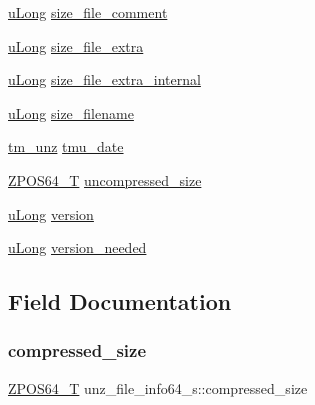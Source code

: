 \begin{DoxyCompactItemize}
\hyperlink{ioapi_8h_a50e9e9d5c30e481de822ad68fe537986}{u\+Long} \hyperlink{structunz__file__info64__s_aff23e3bb5b9a3a8a26aa4f4cfcca7c9c}{size\+\_\+file\+\_\+comment}
\item 
\hyperlink{ioapi_8h_a50e9e9d5c30e481de822ad68fe537986}{u\+Long} \hyperlink{structunz__file__info64__s_a12af3fa77dc4f7f28448d68703eb8c18}{size\+\_\+file\+\_\+extra}
\item 
\hyperlink{ioapi_8h_a50e9e9d5c30e481de822ad68fe537986}{u\+Long} \hyperlink{structunz__file__info64__s_a1083dcf05969f646849b8689d9380270}{size\+\_\+file\+\_\+extra\+\_\+internal}
\item 
\hyperlink{ioapi_8h_a50e9e9d5c30e481de822ad68fe537986}{u\+Long} \hyperlink{structunz__file__info64__s_ac09e3b96910b5f98ec73688116b6b3fd}{size\+\_\+filename}
\item 
\hyperlink{unzip_8h_a369a14c48c4b71afa6bf6cf95c6b9160}{tm\+\_\+unz} \hyperlink{structunz__file__info64__s_a9bf3787641ee4345df714293ee31c51e}{tmu\+\_\+date}
\item 
\hyperlink{ioapi_8h_afffed08ed7f2413fa38e12a223ae0e72}{Z\+P\+O\+S64\+\_\+T} \hyperlink{structunz__file__info64__s_a8cf74465a9d0641cdf1bb22c33f09b42}{uncompressed\+\_\+size}
\item 
\hyperlink{ioapi_8h_a50e9e9d5c30e481de822ad68fe537986}{u\+Long} \hyperlink{structunz__file__info64__s_a4262e51be02716b887447e68c231006b}{version}
\item 
\hyperlink{ioapi_8h_a50e9e9d5c30e481de822ad68fe537986}{u\+Long} \hyperlink{structunz__file__info64__s_ad0041eacba37cb431242d9bd9c86d264}{version\+\_\+needed}
\end{DoxyCompactItemize}


\subsection{Field Documentation}
\mbox{\label{structunz__file__info64__s_afefa321d4008a52a609d437ed4b4e03f}} 
\subsubsection{\texorpdfstring{compressed\+\_\+size}{compressed\_size}}
{\footnotesize\ttfamily \hyperlink{ioapi_8h_afffed08ed7f2413fa38e12a223ae0e72}{Z\+P\+O\+S64\+\_\+T} unz\+\_\+file\+\_\+info64\+\_\+s\+::compressed\+\_\+size}

